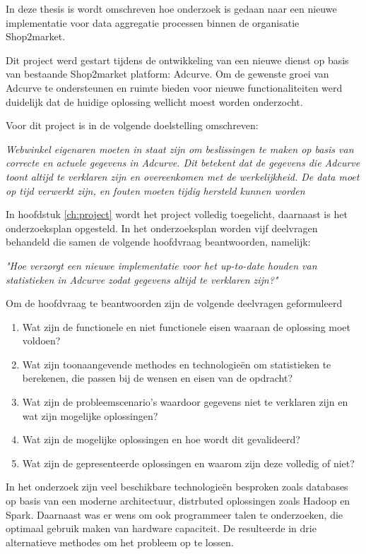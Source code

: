 
In deze thesis is wordt omschreven hoe onderzoek is gedaan naar een nieuwe implementatie voor data aggregatie processen binnen de organisatie Shop2market.

Dit project werd gestart tijdens de ontwikkeling van een nieuwe dienst op basis van bestaande Shop2market platform: Adcurve. Om de gewenste groei van Adcurve te ondersteunen en ruimte bieden voor nieuwe functionaliteiten werd duidelijk dat de huidige oplossing wellicht moest worden onderzocht.


Voor dit project is in de volgende doelstelling omschreven:

\textit{Webwinkel eigenaren moeten in staat zijn om beslissingen te maken op basis van correcte en actuele gegevens in Adcurve. Dit betekent dat de gegevens die Adcurve toont altijd te verklaren zijn en overeenkomen met de werkelijkheid. De data moet op tijd verwerkt zijn, en fouten moeten tijdig hersteld kunnen worden}


In hoofdstuk \ref{ch:project} wordt het project volledig toegelicht, daarnaast is het onderzoeksplan opgesteld. In het onderzoeksplan worden vijf deelvragen behandeld die samen de volgende hoofdvraag beantwoorden, namelijk:

\medskip
{\large \textit{"Hoe verzorgt een nieuwe implementatie voor het up-to-date houden van statistieken in Adcurve zodat gegevens altijd te verklaren zijn?"}}
\medskip

Om de hoofdvraag te beantwoorden zijn de volgende deelvragen geformuleerd

\begin{enumerate}
\item Wat zijn de functionele en niet functionele eisen waaraan de oplossing moet voldoen?
\item Wat zijn toonaangevende methodes en technologieën om statistieken te berekenen, die passen bij de wensen en eisen van de opdracht?
\item Wat zijn de probleemscenario's waardoor gegevens niet te verklaren zijn en wat zijn mogelijke oplossingen?
\item Wat zijn de mogelijke oplossingen en hoe wordt dit gevalideerd?
\item Wat zijn de gepresenteerde oplossingen en waarom zijn deze volledig of niet?
\end{enumerate}


In het onderzoek zijn veel beschikbare technologieën besproken zoals databases op basis van een moderne architectuur, distrbuted oplossingen zoals Hadoop en Spark. Daarnaast was er wens om ook programmeer talen te onderzoeken, die optimaal gebruik maken van hardware capaciteit. De resulteerde in drie alternatieve methodes om het probleem op te lossen.

